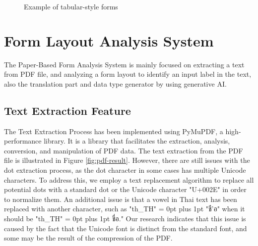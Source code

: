 \documentclass[12pt,oneside,openright,a4paper]{cpe-english-project}
\begin{document}
\begin{figure}[H]
\centering
{}
\caption{Example of tabular-style forms}\label{fig:tabular-form}
\end{figure}

\section{Form Layout Analysis System}

The Paper-Based Form Analysis System is mainly focused on extracting a text from PDF file, and analyzing a form layout to identify an input label in the text, also the translation part and data type generator by using generative AI.

\subsection{Text Extraction Feature}

The Text Extraction Process has been implemented using PyMuPDF, a high-performance library. It is a library that facilitates the extraction, analysis, conversion, and manipulation of PDF data. The text extraction from the PDF file is illustrated in Figure \ref{fig:pdf-result}. However, there are still issues with the dot extraction process, as the dot character in some cases has multiple Unicode characters. To address this, we employ a text replacement algorithm to replace all potential dots with a standard dot or the Unicode character "U+002E" in order to normalize them. An additional issue is that a vowel in Thai text has been replaced with another character, such as {
\XeTeXlinebreaklocale "th_TH"	
\XeTeXlinebreakskip = 0pt plus 1pt
\thaifont
"ชื'อ"} when it should be {
\XeTeXlinebreaklocale "th_TH"	
\XeTeXlinebreakskip = 0pt plus 1pt
\thaifont
 ชื่อ."} Our research indicates that this issue is caused by the fact that the Unicode font is distinct from the standard font, and some may be the result of the compression of the PDF.
\end{document}
